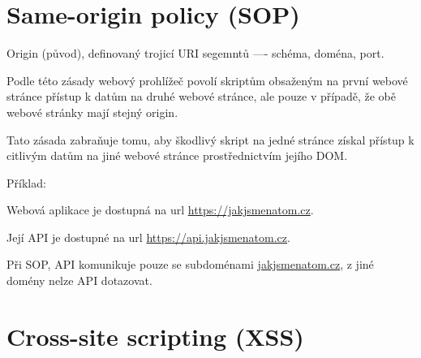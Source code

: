 
\section{Same-origin policy (SOP)}

\begin{compactitem}
    \item Origin (původ), definovaný trojicí URI segemntů ---- schéma, doména, port.

    \item Podle této zásady webový prohlížeč povolí skriptům obsaženým na první webové stránce přístup k datům na druhé webové stránce, ale pouze v případě, že obě webové stránky mají stejný origin.

    \item Tato zásada zabraňuje tomu, aby škodlivý skript na jedné stránce získal přístup k citlivým datům na jiné webové stránce prostřednictvím jejího DOM.

    \item Příklad: \begin{compactitem}
        \item Webová aplikace je dostupná na url \url{https://jakjsmenatom.cz}.
        \item Její API je dostupné na url \url{https://api.jakjsmenatom.cz}.
        \item Při SOP, API komunikuje pouze se subdoménami \url{jakjsmenatom.cz}, z jiné domény nelze API dotazovat.
    \end{compactitem}
\end{compactitem}


\section{Cross-site scripting (XSS)}

